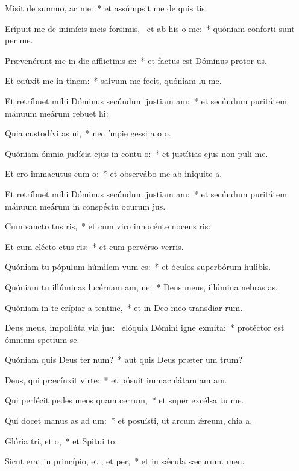 \item Misit de summo,  ac me:~* et assúmpsit me de quis tis.
\item Erípuit me de inimícis meis forsimis,~\pscross{} et ab his  o me:~* quóniam conforti sunt per me.
\item Prævenérunt me in die afflictinis æ:~* et factus est Dóminus protor us.
\item Et edúxit me in tinem:~* salvum me fecit, quóniam lu me.
\item Et retríbuet mihi Dóminus secúndum justiam am:~* et secúndum puritátem mánuum meárum rebuet hi:
\item Quia custodívi as ni,~* nec ímpie gessi a o o.
\item Quóniam ómnia judícia ejus in contu o:~* et justítias ejus non puli  me.
\item Et ero immacutus cum o:~* et observábo me ab iniquite a.
\item Et retríbuet mihi Dóminus secúndum justiam am:~* et secúndum puritátem mánuum meárum in conspéctu ocurum jus.
\item Cum sancto tus ris,~* et cum viro innocénte nocens ris:
\item Et cum elécto etus ris:~* et cum pervérso verris.
\item Quóniam tu pópulum húmilem vum es:~* et óculos superbórum hulibis.
\item Quóniam tu illúminas lucérnam am, ne:~* Deus meus, illúmina nebras as.
\item Quóniam in te erípiar a tentine,~* et in Deo meo transdiar rum.
\item Deus meus, impollúta via jus:~\pscross{} elóquia Dómini igne exmita:~* protéctor est ómnium spetium  se.
\item Quóniam quis Deus ter num?~* aut quis Deus præter um trum?
\item Deus, qui præcínxit  virte:~* et pósuit immaculátam am am.
\item Qui perfécit pedes meos quam cerrum,~* et super excélsa tu me.
\item Qui docet manus as ad um:~* et posuísti, ut arcum ǽreum, chia a.
\item Glória tri, et o,~* et Spitui to.
\item Sicut erat in princípio, et , et per,~* et in sǽcula sæcurum. men.
